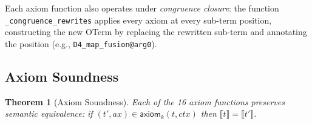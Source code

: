 \documentclass[11pt,a4paper]{report}
\theoremstyle{definition}
\theoremstyle{plain}
\newtheorem{theorem}[definition]{Theorem}
\newcommand{\den}[1]{\llbracket #1 \rrbracket}
\begin{document}
Each axiom function also operates under \emph{congruence closure}:
the function \texttt{\_congruence\_rewrites} applies every axiom
at every sub-term position, constructing the new OTerm by replacing
the rewritten sub-term and annotating the position (e.g.,
\texttt{D4\_map\_fusion@arg0}).

\subsection{Axiom Soundness}

\begin{theorem}[Axiom Soundness]
\label{thm:axiom-soundness}
Each of the 16 axiom functions preserves semantic equivalence:
if $(t', \mathit{ax}) \in \mathsf{axiom}_k(t, \mathit{ctx})$
then $\den{t} = \den{t'}$.
\end{theorem}
\end{document}
